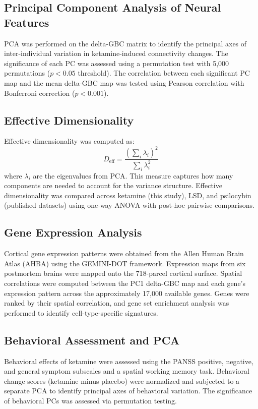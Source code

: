 \documentclass[12pt]{article}
\begin{document}
\subsection{Principal Component Analysis of Neural Features}

PCA was performed on the delta-GBC matrix to identify the principal axes of inter-individual variation in ketamine-induced connectivity changes. The significance of each PC was assessed using a permutation test with 5,000 permutations ($p < 0.05$ threshold). The correlation between each significant PC map and the mean delta-GBC map was tested using Pearson correlation with Bonferroni correction ($p < 0.001$).

\subsection{Effective Dimensionality}

Effective dimensionality was computed as:
\begin{equation}
D_{\text{eff}} = \frac{\left(\sum_i \lambda_i\right)^2}{\sum_i \lambda_i^2}
\end{equation}
where $\lambda_i$ are the eigenvalues from PCA. This measure captures how many components are needed to account for the variance structure. Effective dimensionality was compared across ketamine (this study), LSD, and psilocybin (published datasets) using one-way ANOVA with post-hoc pairwise comparisons.

\subsection{Gene Expression Analysis}

Cortical gene expression patterns were obtained from the Allen Human Brain Atlas (AHBA) using the GEMINI-DOT framework. Expression maps from six postmortem brains were mapped onto the 718-parcel cortical surface. Spatial correlations were computed between the PC1 delta-GBC map and each gene's expression pattern across the approximately 17,000 available genes. Genes were ranked by their spatial correlation, and gene set enrichment analysis was performed to identify cell-type-specific signatures.

\subsection{Behavioral Assessment and PCA}

Behavioral effects of ketamine were assessed using the PANSS positive, negative, and general symptom subscales and a spatial working memory task. Behavioral change scores (ketamine minus placebo) were normalized and subjected to a separate PCA to identify principal axes of behavioral variation. The significance of behavioral PCs was assessed via permutation testing.
\end{document}

